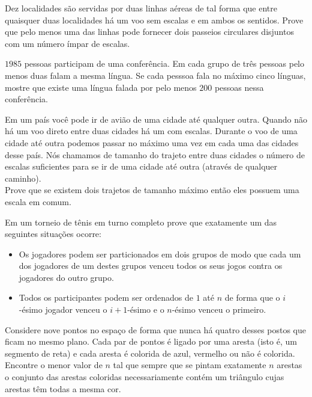 \begin{questao}
  Dez localidades são servidas por duas linhas aéreas de tal
  forma que entre quaisquer duas localidades há um voo sem escalas e
  em ambos os sentidos. Prove que pelo menos uma das linhas pode
  fornecer dois passeios circulares disjuntos com um número ímpar de
  escalas.
\end{questao}

\begin{questao}  
  $1985$ pessoas participam de uma conferência. Em cada grupo de
  três pessoas pelo menos duas falam a mesma língua. Se cada pesssoa
  fala no máximo cinco línguas, mostre que existe uma língua falada
  por pelo menos $200$ pessoas nessa conferência.
\end{questao}

\begin{questao}
  Em um país você pode ir de avião de uma cidade até qualquer
  outra. Quando não há um voo direto entre duas cidades há um com
  escalas. Durante o voo de uma cidade até outra podemos passar no
  máximo uma vez em cada uma das cidades desse país. Nós chamamos de
  tamanho do trajeto entre duas cidades o número de escalas
  suficientes para se ir de uma cidade até outra (através de qualquer
  caminho).\\
  Prove que se existem dois trajetos de tamanho máximo então eles
  possuem uma escala em comum.
\end{questao}

\begin{questao}
  Em um torneio de tênis em turno completo prove que exatamente um das
  seguintes situações ocorre:

  \begin{itemize}
    \item Os jogadores podem ser particionados em dois grupos de modo
    que cada um dos jogadores de um destes grupos venceu todos os seus
    jogos contra os jogadores do outro grupo.

    \item Todos os participantes podem ser ordenados de $1$ até
    $n$ de forma que o $i$-ésimo jogador venceu o $i+1$-ésimo
    e o $n$-ésimo venceu o primeiro.
  \end{itemize}
\end{questao}

\begin{questao}
  Considere nove pontos no espaço de forma que nunca há quatro desses
  postos que ficam no mesmo plano. Cada par de pontos é ligado por uma
  aresta (isto é, um segmento de reta) e cada aresta é colorida de
  azul, vermelho ou não é colorida. Encontre o menor valor de $n$
  tal que sempre que se pintam exatamente $n$ arestas o conjunto das
  arestas coloridas necessariamente contém um triângulo cujas arestas
  têm todas a mesma cor.
\end{questao}


